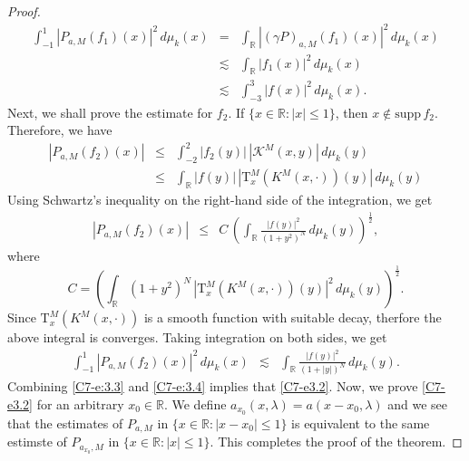 \documentclass[10pt,a4paper]{amsart}
\newcommand{\Tau}{\mathrm{T}}
\begin{document}
\begin{proof}
\begin{eqnarray}
\nonumber    \int_{-1}^{1} |P_{a,M}(f_1)(x)|^2\,d\mu_k(x) &=& \int_{\mathbb{R}} |
(\gamma P)_{a,M}(f_1)(x)|^2\, d\mu_k(x)\\
\nonumber  &\lesssim&    \int_{\mathbb{R}} |f_1(x)|^2\, d\mu_k(x) \\
  &\lesssim& \int_{-3}^3 |f(x)|^2\, d\mu_k(x).\label{C7-e:3.3}
\end{eqnarray}
Next, we shall prove the estimate for $f_2$. If $\{x\in \mathbb{R}:|x|\le 1\}$, then $x \notin \text{supp}\,f_2$. Therefore,  we have 
\begin{eqnarray*}
   | P_{a,M}(f_2)(x)| &\le& \int_{-2}^2 |f_2(y)|\, |\mathcal{K}^M(x,y)|\,d\mu_k(y)\\
    &\le&  \int_{\mathbb{R}}  |f(y)|\,|\Tau_x^M(K^M(x,\cdot))(y)|\,d\mu_k(y)
    \end{eqnarray*}
    Using Schwartz's inequality on the right-hand side of the integration, we get
    \begin{eqnarray*}
| P_{a,M}(f_2)(x)|    &\le& C\, \left(\int_{\mathbb{R}} \frac{|f(y)|^2}{(1+y^2)^N}\, d\mu_k(y)\right)^{\frac{1}{2}},
    \end{eqnarray*}
where 
\begin{equation*}
    C = \left(\int_{\mathbb{R}}(1+y^2)^N\,|\Tau_x^M(K^M(x,\cdot))(y)|^2\, d\mu_k(y)\right)^{\frac{1}{2}}.
\end{equation*}
Since $\Tau_x^M(K^M(x,\cdot))$ is a smooth function with suitable decay, therfore the above integral is converges.
Taking integration on both sides, we get
    \begin{eqnarray}\label{C7-e:3.4}
\int_{-1}^1  | P_{a,M}(f_2)(x)|^2\,d\mu_k(x)  &\lesssim&  \int_{\mathbb{R}} \frac{|f(y)|^2}{(1+|y|)^N}\, d\mu_k(y).
\end{eqnarray}
Combining \eqref{C7-e:3.3} and \eqref{C7-e:3.4} implies that \eqref{C7-e3.2}.
Now, we prove \eqref{C7-e3.2}   for an arbitrary $x_0\in \mathbb{R}$. We define $a_{x_0}(x,\lambda) = a(x-x_0, \lambda)$ and we see that the estimates of $P_{a,M}$ in $\{x\in \mathbb{R}:|x-x_0| \le 1\}$ is equivalent to  the same estimste of $P_{a_{x_0},M}$ in $\{x\in \mathbb{R}: |x|\le1\}$. This completes the proof of the theorem.
\end{proof} 
\end{document}
